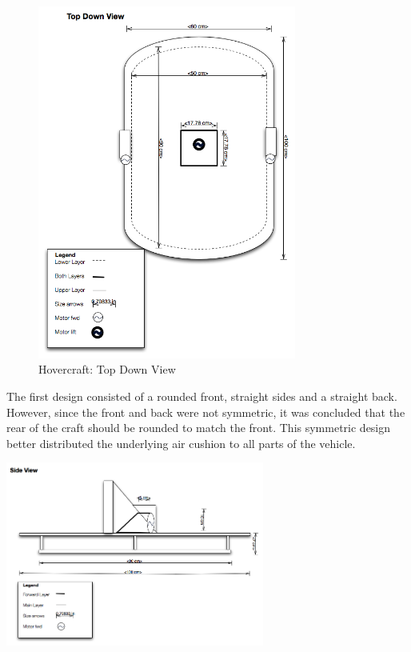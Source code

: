 \begin{figure}[h]
  \begin{center}
    \includegraphics[width=85mm]{imageSources/topDownView.png}
  \end{center}
  \caption{Hovercraft: Top Down View} 
  \label{topDownView}
\end{figure}

The first design consisted of a rounded front, straight sides and a straight back. However, since the front and back were not symmetric, it was concluded that the rear of the craft should be rounded to match the front. This symmetric design better distributed the underlying air cushion to all parts of the vehicle.

  \begin{center}
    \includegraphics[width=85mm]{imageSources/sideView.png}
  \end{center}
  \caption{Hovercraft: Side View} 
  \label{sideView}


